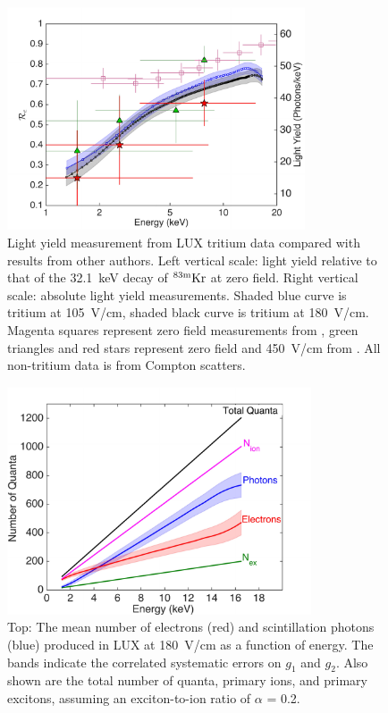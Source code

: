 \begin{figure}[t!]
\includegraphics[width=88mm]{fig/fig8.pdf}
\caption{Light yield measurement from LUX tritium data compared with results from other authors. Left vertical scale: light yield relative to that of the 32.1~keV decay of $\rm ^{83m}Kr $ at zero field. Right vertical scale: absolute light yield measurements. Shaded blue curve is tritium at 105~V/cm, shaded black curve is tritium at 180~V/cm. Magenta squares represent zero field measurements from \cite{Aprile_LY}, green triangles and red stars represent zero field and 450~V/cm from \cite{Baudis}. All non-tritium data is from Compton scatters. }
\label{fig:Re_LY}
\end{figure}

\begin{figure}[t!]
\includegraphics[width=90mm]{fig/fig9.pdf}
\caption{Top: The mean number of electrons (red) and scintillation photons (blue) produced in LUX at 180~V/cm as a function of energy. The bands indicate the correlated systematic errors on $g_1$ and $g_2$. Also shown are the total number of quanta, primary ions, and primary excitons, assuming an exciton-to-ion ratio of $\alpha$ = 0.2. }
\label{fig:quanta-vs-energy}
\end{figure}

